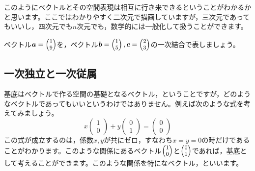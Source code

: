 \documentclass{ltjsbook}
\begin{document}
このようにベクトルとその空間表現は相互に行き来できるということがわかるかと思います。ここではわかりやすく二次元で描画していますが，三次元であってもいいし，四次元でも$n$次元でも，数学的には一般化して扱うことができます。

\begin{reidai}{}{}
	ベクトル$\bm{a} = \footnotesize\begin{pmatrix} 1\\9 \end{pmatrix}$を，ベクトル$\bm{b} = \footnotesize\begin{pmatrix}1\\5\end{pmatrix},\bm{c} = \footnotesize\begin{pmatrix}2\\3\end{pmatrix}$の一次結合で表しましょう。
\end{reidai}
\subsection{一次独立と一次従属}
\label{LinerIndependent}
基底はベクトルで作る空間の基礎となるベクトル，ということですが，どのようなベクトルであってもいいというわけではありません。例えば次のような式を考えてみましょう。
\[ x \begin{pmatrix}1\\0\end{pmatrix} + y\begin{pmatrix} 0\\1\end{pmatrix} = \begin{pmatrix}0\\0\end{pmatrix} \]
この式が成立するのは，係数$x,y$が共にゼロ，すなわち$x = y = 0$の時だけであることがわかります。このような関係にあるベクトル$\footnotesize\begin{pmatrix}1\\0\end{pmatrix}$と$\footnotesize\begin{pmatrix}0 \\ 1\end{pmatrix}$であれば，基底として考えることができます。このような関係を特になベクトル，といいます。
\end{document}
